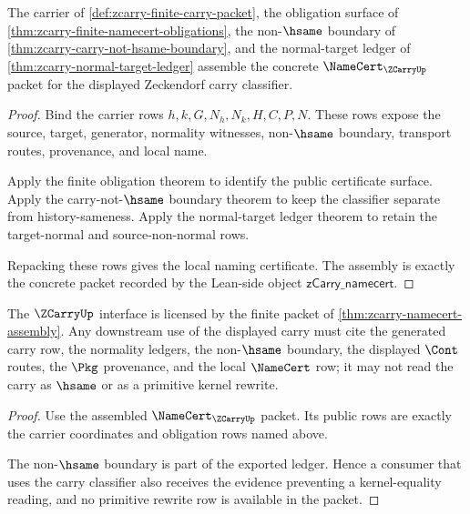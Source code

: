 \begin{theorem}
\label{thm:zcarry-namecert-assembly}
The carrier of \autoref{def:zcarry-finite-carry-packet}, the obligation surface
of \autoref{thm:zcarry-finite-namecert-obligations}, the non-$\hsame$ boundary
of \autoref{thm:zcarry-carry-not-hsame-boundary}, and the normal-target ledger
of \autoref{thm:zcarry-normal-target-ledger} assemble the concrete
$\NameCert_{\ZCarryUp}$ packet for the displayed Zeckendorf carry classifier.
\end{theorem}
\begin{proof}
Bind the carrier rows $h,k,G,N_h,N_k,H,C,P,N$. These rows expose the source,
target, generator, normality witnesses, non-$\hsame$ boundary, transport routes,
provenance, and local name.

Apply the finite obligation theorem to identify the public certificate surface.
Apply the carry-not-$\hsame$ boundary theorem to keep the classifier separate
from history-sameness. Apply the normal-target ledger theorem to retain the
target-normal and source-non-normal rows.

Repacking these rows gives the local naming certificate. The assembly is exactly
the concrete packet recorded by the Lean-side object
$\mathsf{zCarry\_namecert}$.
\end{proof}

\begin{corollary}
\label{cor:zcarry-licensed-classifier-boundary}
The $\ZCarryUp$ interface is licensed by the finite packet of
\autoref{thm:zcarry-namecert-assembly}. Any downstream use of the displayed
carry must cite the generated carry row, the normality ledgers, the non-$\hsame$
boundary, the displayed $\Cont$ routes, the $\Pkg$ provenance, and the local
$\NameCert$ row; it may not read the carry as $\hsame$ or as a primitive kernel
rewrite.
\end{corollary}
\begin{proof}
Use the assembled $\NameCert_{\ZCarryUp}$ packet. Its public rows are exactly
the carrier coordinates and obligation rows named above.

The non-$\hsame$ boundary is part of the exported ledger. Hence a consumer that
uses the carry classifier also receives the evidence preventing a kernel-equality
reading, and no primitive rewrite row is available in the packet.
\end{proof}

